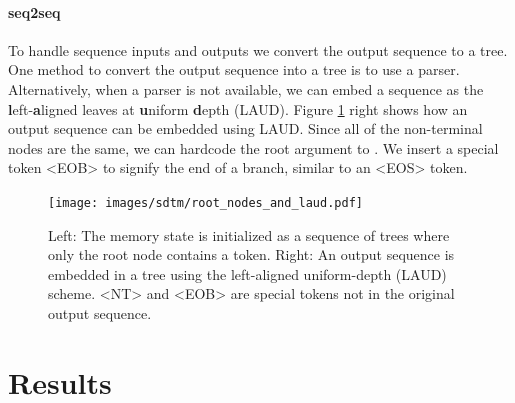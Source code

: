 \paragraph{seq2seq} To handle sequence inputs and outputs we convert the output sequence to a tree. One method to convert the output sequence into a tree is to use a parser. Alternatively, when a parser is not available, we can embed a sequence as the \textbf{l}eft-\textbf{a}ligned leaves at \textbf{u}niform \textbf{d}epth (LAUD). Figure \ref{fig:root-and-laud} right shows how an output sequence can be embedded using LAUD. Since all of the non-terminal nodes are the same, we can hardcode the root argument to \cons. We insert a special token <EOB> to signify the end of a branch, similar to an <EOS> token.

\begin{figure}
    \centering
    \texttt{[image: images/sdtm/root\_nodes\_and\_laud.pdf]}
    \caption{Left: The memory state is initialized as a sequence of trees where only the root node contains a token. Right: An output sequence is embedded in a tree using the left-aligned uniform-depth (LAUD) scheme. <NT> and <EOB> are special tokens not in the original output sequence.}
    \label{fig:root-and-laud}
\end{figure}

\section{Results} \label{sec:sdtm-results}

